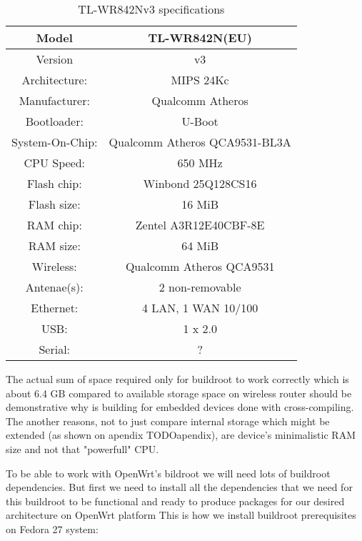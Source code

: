 \begin{table}[h]
\centering
\label{routerspec}
\begin{tabular}{c|c}
\hline
Model           &   TL-WR842N(EU)                   \\ \hline
Version         &   v3                              \\ \hline
Architecture:   &   MIPS 24Kc                       \\ \hline
Manufacturer:   &   Qualcomm Atheros                \\ \hline
Bootloader:     &   U-Boot                          \\ \hline
System-On-Chip: &   Qualcomm Atheros QCA9531-BL3A   \\ \hline
CPU Speed:      &   650 MHz                         \\ \hline
Flash chip:     &   Winbond 25Q128CS16              \\ \hline
Flash size:     &   16 MiB                          \\ \hline
RAM chip:       &   Zentel A3R12E40CBF-8E           \\ \hline
RAM size:       &   64 MiB                          \\ \hline
Wireless:       &   Qualcomm Atheros QCA9531        \\ \hline
Antenae(s):     &   2 non-removable                 \\ \hline
Ethernet:       &   4 LAN, 1 WAN 10/100             \\ \hline
USB:            &   1 x 2.0                         \\ \hline
Serial:         &   ?                               \\ \hline
\end{tabular}
\caption{TL-WR842Nv3 specifications}
\end{table}

The actual sum of space required only for buildroot to work correctly which is about 6.4 GB compared to available storage space on wireless router should be demonstrative why is building for embedded devices done with cross-compiling.
The another reasons, not to just compare internal storage which might be extended (as shown on apendix TODOapendix), are device's minimalistic RAM size and not that "powerfull" CPU.

To be able to work with OpenWrt's bildroot we will need lots of buildroot dependencies.
But first we need to install all the dependencies that we need for this buildroot to be functional and ready to produce packages for our desired architecture on OpenWrt platform
This is how we install buildroot prerequisites on Fedora 27 system:

